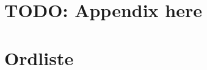 \documentclass[12pt]{report}
\begin{document}
\appendix

	\chapter{TODO: Appendix here}

\pagestyle{plain}
\pagebreak
{}
\setcounter{page}{1} %

\chapter{Ordliste}

	

	

\end{document}
